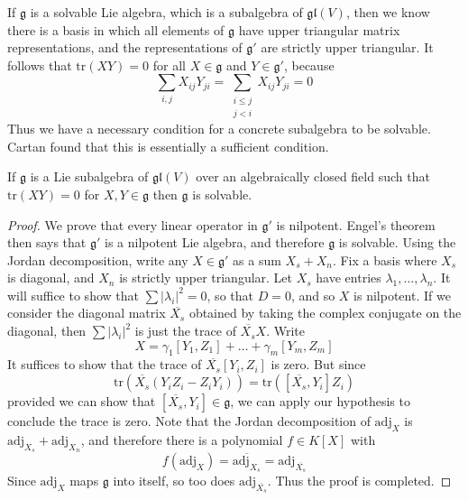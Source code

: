 If $\mathfrak{g}$ is a solvable Lie algebra, which is a subalgebra of $\mathfrak{gl}(V)$, then we know there is a basis in which all elements of $\mathfrak{g}$ have upper triangular matrix representations, and the representations of $\mathfrak{g}'$ are strictly upper triangular. It follows that $\text{tr}(XY) = 0$ for all $X \in \mathfrak{g}$ and $Y \in \mathfrak{g}'$, because
%
\[ \sum_{i,j} X_{ij}Y_{ji} = \sum_{\substack{i \leq j\\j < i}} X_{ij} Y_{ji} = 0 \]
%
Thus we have a necessary condition for a concrete subalgebra to be solvable. Cartan found that this is essentially a sufficient condition.

\begin{theorem}
    If $\mathfrak{g}$ is a Lie subalgebra of $\mathfrak{gl}(V)$ over an algebraically closed field such that $\text{tr}(XY) = 0$ for $X,Y \in \mathfrak{g}$ then $\mathfrak{g}$ is solvable.
\end{theorem}
\begin{proof}
    We prove that every linear operator in $\mathfrak{g}'$ is nilpotent. Engel's theorem then says that $\mathfrak{g}'$ is a nilpotent Lie algebra, and therefore $\mathfrak{g}$ is solvable. Using the Jordan decomposition, write any $X \in \mathfrak{g}'$ as a sum $X_s + X_n$. Fix a basis where $X_s$ is diagonal, and $X_n$ is strictly upper triangular. Let $X_s$ have entries $\lambda_1, \dots, \lambda_n$. It will suffice to show that $\sum |\lambda_i|^2 = 0$, so that $D = 0$, and so $X$ is nilpotent. If we consider the diagonal matrix $\overline{X_s}$ obtained by taking the complex conjugate on the diagonal, then $\sum |\lambda_i|^2$ is just the trace of $\overline{X_s}X$. Write
    \[ X = \gamma_1 [Y_1, Z_1] + \dots + \gamma_m [Y_m, Z_m] \]
    It suffices to show that the trace of $\overline{X_s}[Y_i,Z_i]$ is zero. But since
    \[ \text{tr}(\overline{X_s}(Y_iZ_i - Z_iY_i)) = \text{tr}([\overline{X_s}, Y_i]Z_i) \]
    provided we can show that $[\overline{X_s},Y_i] \in \mathfrak{g}$, we can apply our hypothesis to conclude the trace is zero. Note that the Jordan decomposition of $\text{adj}_X$ is $\text{adj}_{X_s} + \text{adj}_{X_n}$, and therefore there is a polynomial $f \in K[X]$ with
    \[ f(\text{adj}_X) = \overline{\text{adj}_{X_s}} = \text{adj}_{\overline{X_s}} \]
    Since $\text{adj}_X$ maps $\mathfrak{g}$ into itself, so too does $\text{adj}_{\overline{X_s}}$. Thus the proof is completed.
\end{proof}


